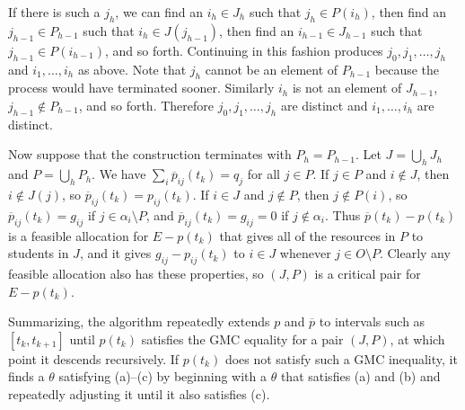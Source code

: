 \documentclass[12pt]{article}
\theoremstyle{definition}
\newcommand{\barp}{\overline{p}}
\begin{document}
\begin{appendix}
If there is such a $j_h$, we can find an $i_h \in J_h$ such that $j_h
\in P(i_h)$, then find an $j_{h-1} \in P_{h-1}$ such
that $i_h \in J(j_{h-1})$, then find an $i_{h-1} \in
J_{h-1}$ such that $j_{h-1} \in P(i_{h-1})$, and so
forth.  Continuing in this fashion produces $j_0,j_1, \ldots, j_h$ and
$i_1, \ldots, i_h$ as above.  Note that $j_h$ cannot be an element of
$P_{h-1}$ because the process would have terminated sooner.  Similarly
$i_h$ is not an element of $J_{h-1}$, $j_{h-1} \notin P_{h-1}$, and so
forth.  Therefore $j_0,j_1, \ldots, j_h$ are distinct and $i_1,
\ldots, i_h$ are distinct.

Now suppose that the construction terminates with $P_h = P_{h-1}$.
Let $J = \bigcup_h J_h$ and $P = \bigcup_h P_h$.  We have $\sum_i
\barp_{ij}(t_k) = q_j$ for all $j \in P$.  If $j \in P$ and $i \notin
J$, then $i \notin J(j)$, so $\barp_{ij}(t_k) = p_{ij}(t_k)$.  If $i
\in J$ and $j \notin P$, then $j \notin P(i)$, so $\barp_{ij}(t_k) =
g_{ij}$ if $j \in \alpha_i \setminus P$, and $\barp_{ij}(t_k) = g_{ij}
= 0$ if $j \notin \alpha_i$. Thus $\barp(t_k) - p(t_k)$ is a feasible
allocation for $E - p(t_k)$ that gives all of the resources in $P$ to
students in $J$, and it gives $g_{ij} - p_{ij}(t_k)$ to $i \in J$
whenever $j \in O \setminus P$. Clearly any feasible allocation also
has these properties, so $(J,P)$ is a critical pair for $E - p(t_k)$.

Summarizing, the algorithm repeatedly extends $p$ and $\barp$ to
intervals such as $[t_k,t_{k+1}]$ until $p(t_k)$ satisfies the GMC
equality for a pair $(J,P)$, at which point it descends
recursively. If $p(t_k)$ does not satisfy such a GMC inequality, it
finds a $\theta$ satisfying (a)--(c) by beginning with a $\theta$ that
satisfies (a) and (b) and repeatedly adjusting it until it also
satisfies (c).


\end{appendix}
\end{document}
